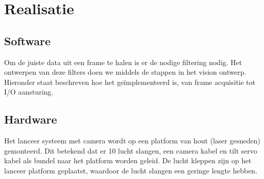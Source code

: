 \chapter{Realisatie}
\label{chap:realisation}


\section{Software}

Om de juiste data uit een frame te halen is er de nodige filtering nodig.
Het ontwerpen van deze filters doen we middels de stappen in het vision ontwerp.
Hieronder staat beschreven hoe het geïmplementeerd is, van frame acquisitie tot
I/O aansturing.













\section{Hardware}
\label{sec:hardware}

Het lanceer systeem met camera wordt op een platform van hout (laser gesneden)
gemonteerd. Dit betekend dat er 10 lucht slangen, een camera kabel en tilt servo
kabel als bundel naar het platform worden geleid. De lucht kleppen zijn op het
lanceer platform geplaatst, waardoor de lucht slangen een geringe lengte hebben.










